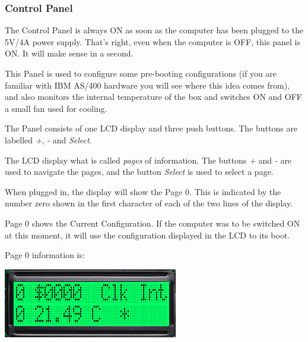         \subsubsection{Control Panel}
        \label{subsubsec:controlpanel}

        The Control Panel is always ON as soon as the computer has been plugged
        to the 5V/4A power supply. That's right, even when the computer is OFF,
        this panel is ON. It will make sense in a second.
        
        This Panel is used to configure some pre-booting configurations (if you
        are familiar with IBM AS/400 hardware you will see where this idea comes
        from), and also monitors the internal temperature of the box and
        switches ON and OFF a small fan used for cooling.

        The Panel consists of one LCD display and three push buttons. The
        buttons are labelled \textit{+}, \textit{-} and \textit{Select}.

        The LCD display what is called \textit{pages} of information. The
        buttons \textit{+} and \textit{-} are used to navigate the pages, and
        the button \textit{Select} is used to select a page.
        
        When plugged in, the display will show the Page 0. This is indicated by
        the number zero shown in the first character of each of the two lines of
        the display.

        Page 0 shows the Current Configuration. If the computer was to be
        switched ON at this moment, it will use the configuration displayed in
        the LCD to its boot.

        Page 0 information is:
        
        \begin{center}
            \includegraphics[scale=0.7]{images/dastaZ80_ControlPanel_Page0.png}
        \end{center}


